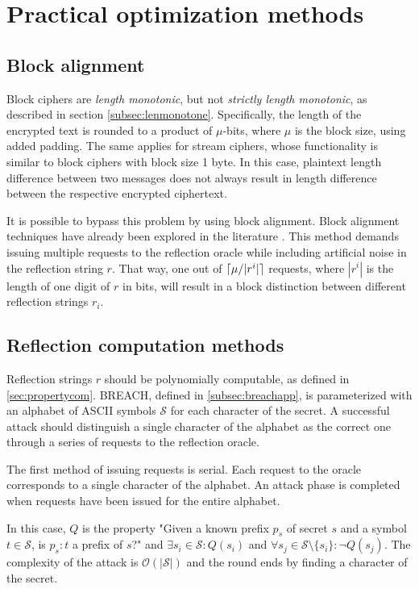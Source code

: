 \documentclass{sig-alternate-05-2015}
\DeclarePairedDelimiter{\ceil}{\lceil}{\rceil}
\begin{document}
\section{Practical optimization methods}\label{app:optimization}

\subsection{Block alignment}\label{subsec:blockalign}
Block ciphers are \textit{length monotonic}, but not \textit{strictly length
monotonic}, as described in section \ref{subsec:lenmonotone}. Specifically, the
length of the encrypted text is rounded to a product of $\mu$-bits, where $\mu$
is the block size, using added padding. The same applies for stream ciphers,
whose functionality is similar to block ciphers with block size 1 byte. In this
case, plaintext length difference between two messages does not always result in
length difference between the respective encrypted ciphertext.

It is possible to bypass this problem by using block alignment. Block alignment
techniques have already been explored in the literature \cite{c14}.  This method
demands issuing multiple requests to the reflection oracle while including
artificial noise in the reflection string $r$.  That way, one out of
$\ceil{\mu / |r^i|}$ requests, where $|r^i|$ is the length of one digit of
$r$ in bits, will result in a block distinction between different reflection
strings $r_i$.

\subsection{Reflection computation methods}\label{subsec:reflectionmethods}
Reflection strings $r$ should be polynomially computable, as defined in
\ref{sec:propertycom}. BREACH, defined in \ref{subsec:breachapp}, is
parameterized with an alphabet of ASCII symbols $\mathcal{S}$ for each character of the
secret. A successful attack should distinguish a single character of the
alphabet as the correct one through a series of requests to the reflection
oracle.

The first method of issuing requests is serial. Each request to the oracle
corresponds to a single character of the alphabet. An attack phase is completed
when requests have been issued for the entire alphabet.

In this case, $Q$ is the property "Given a known prefix $p_s$ of secret $s$ and
a symbol $t \in \mathcal{S}$, is $p_s:t$ a prefix of $s$?" and $\exists
s_i \in \mathcal{S}: Q(s_i)$ and $\forall s_j \in \mathcal{S} \setminus \{s_i\}:
\lnot Q(s_j)$. The complexity of the attack is $\mathcal{O}(|\mathcal{S}|)$ and
the round ends by finding a character of the secret.
\end{document}
